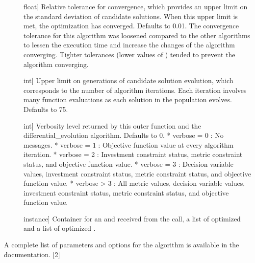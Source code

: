 \documentclass[letterpaper,10pt,english]{sphinxmanual}
\begin{document}
\begin{description}
\item[{}] \leavevmode{[}float{]}
Relative tolerance for convergence, which provides an upper limit on
the standard deviation of candidate solutions. When this upper limit
is met, the optimization has converged. Defaults to 0.01. The
convergence tolerance for this algorithm was loosened compared to the
other algorithms to lessen the execution time and increase the
changes of the algorithm converging. Tighter tolerances (lower values
of ) tended to prevent the algorithm converging.

\item[{}] \leavevmode{[}int{]}
Upper limit on generations of candidate solution evolution, which
corresponds to the number of algorithm iterations. Each iteration
involves many function evaluations as each solution in the population
evolves. Defaults to 75.

\item[{}] \leavevmode{[}int{]}
Verbosity level returned by this outer function and the differential\_evolution algorithm. Defaults to 0.
* verbose = 0 : No messages.
* verbose = 1 : Objective function value at every algorithm iteration.
* verbose = 2 : Investment constraint status, metric constraint status, and objective function value.
* verbose = 3 : Decision variable values, investment constraint status, metric constraint status, and objective function value.
* verbose \textgreater{} 3 : All metric values, decision variable values, investment constraint status, metric constraint status, and objective function value.

\end{description}

\begin{description}
\item[{}] \leavevmode{[} instance{]}
Container for an  and  received from the
 call, a list of optimized  and
a list of optimized .

\end{description}

A complete list of parameters and options for the
 algorithm is available in the documentation.
{[}2{]}
\end{document}
